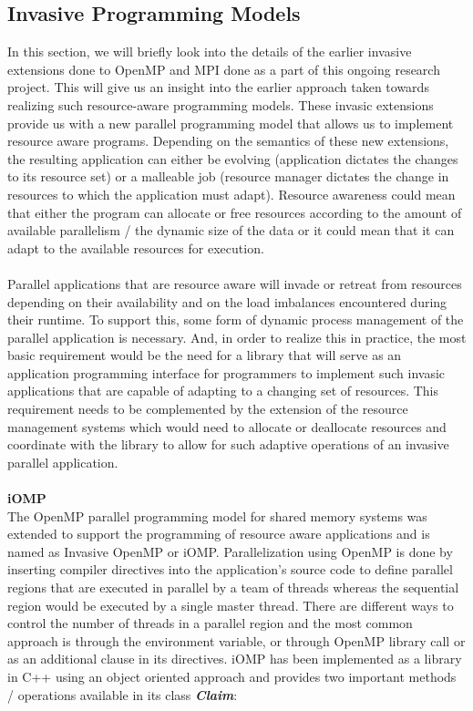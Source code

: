 \subsection{Invasive Programming Models}
In this section, we will briefly look into the details of the earlier invasive extensions done to OpenMP and MPI done as a part of this ongoing research project. This will give us an insight into the earlier approach taken towards realizing such resource-aware programming models. These invasic extensions provide us with a new parallel programming model that allows us to implement resource aware programs. Depending on the semantics of these new extensions, the resulting application can either be evolving (application dictates the changes to its resource set) or a malleable job (resource manager dictates the change in resources to which the application must adapt). Resource awareness could mean that either the program can allocate or free resources according to the amount of available parallelism / the dynamic size of the data or it could mean that it can adapt to the available resources for execution.\\ \\
Parallel applications that are resource aware will invade or retreat from resources depending on their availability and on the load imbalances encountered during their runtime. To support this, some form of dynamic process management of the parallel application is necessary. And, in order to realize this in practice, the most basic requirement would be the need for a library that will serve as an application programming interface for programmers to implement such invasic applications that are capable of adapting to a changing set of resources. This requirement needs to be complemented by the extension of the resource management systems which would need to allocate or deallocate resources and coordinate with the library to allow for such adaptive operations of an invasive parallel application.\\ \\
\textbf{iOMP}\cite{andreas}\\
The OpenMP parallel programming model for shared memory systems was extended to support the programming of resource aware applications and is named as Invasive OpenMP or iOMP. Parallelization using OpenMP is done by inserting compiler directives into the application's source code to define parallel regions that are executed in parallel by a team of threads whereas the sequential region would be executed by a single master thread. There are different ways to control the number of threads in a parallel region and the most common approach is through the environment variable, or through OpenMP library call or as an additional clause in its directives. iOMP has been implemented as a library in C++ using an object oriented approach and provides two important methods / operations available in its class \textbf{\textit{Claim}}:
